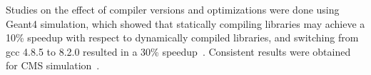 Studies on the effect of compiler versions and optimizations were done
using Geant4 simulation, which showed that statically compiling
libraries may achieve a 10\% speedup with respect to dynamically
compiled libraries, and switching from gcc 4.8.5 to 8.2.0 resulted in
a 30\% speedup~\cite{marcon}. Consistent results were obtained for CMS
simulation~\cite{alejandro}.
